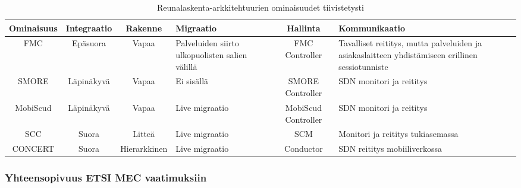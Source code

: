 \begin{landscape}
    \noindent
\begin{table}[!ht]
\caption{Reunalaskenta-arkkitehtuurien ominaisuudet tiivistetysti}
\label{table:features}
\begin{tabularx}{ \hsize }{ | c | c | c | p{3cm} | c | X | }
\hline 
 \textbf{Ominaisuus} & \textbf{Integraatio} & \textbf{Rakenne} & \textbf{Migraatio} & \textbf{Hallinta} & \textbf{Kommunikaatio} \\ 
\hline 
 FMC & Epäsuora & Vapaa & Palveluiden siirto ulkopuolisten salien välillä & FMC Controller & Tavalliset reititys, mutta palveluiden ja asiakaslaitteen yhdistämiseen erillinen sessiotunniste \\ 
\hline 
 SMORE & Läpinäkyvä & Vapaa & Ei sisällä & SMORE Controller & SDN monitori ja reititys \\ 
\hline 
MobiScud & Läpinäkyvä & Vapaa & Live migraatio & MobiScud Controller & SDN monitori ja reititys\\ 
\hline 
SCC & Suora & Litteä & Live migraatio & SCM & Monitori ja reititys tukiasemassa \\ 
\hline 
CONCERT & Suora & Hierarkkinen & Live migraatio & Conductor & SDN reititys mobiiliverkossa \\ 
\hline 
\end{tabularx} 
\end{table}
\end{landscape}

\subsubsection{Yhteensopivuus ETSI MEC vaatimuksiin}




